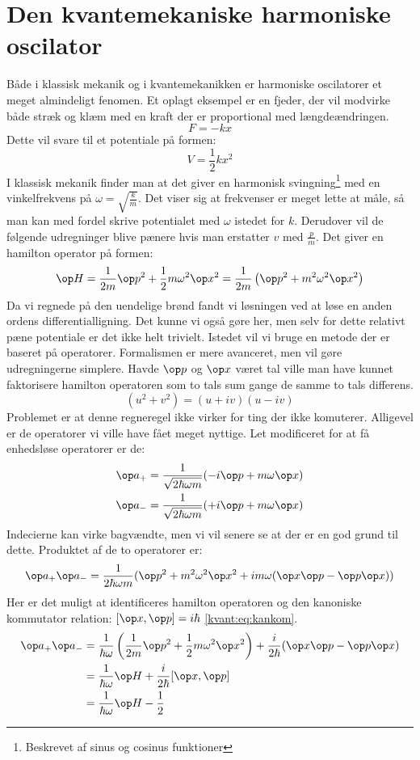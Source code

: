 \section{Den kvantemekaniske harmoniske oscilator}
Både i klassisk mekanik og i kvantemekanikken er harmoniske oscilatorer et meget almindeligt fenomen.
Et oplagt eksempel er en fjeder, der vil modvirke både stræk og klæm med en kraft der er proportional med længdeændringen.
$$
F = -kx
$$
Dette vil svare til et potentiale på formen:
$$
V=\frac{1}{2}kx^2
$$
I klassisk mekanik finder man at det giver en harmonisk svingning\footnote{Beskrevet af sinus og cosinus funktioner} med en vinkelfrekvens på $\omega = \sqrt{\frac{k}{m}}$. Det viser sig at frekvenser er meget lette at måle, så man kan med fordel skrive potentialet med $\omega$ istedet for $k$. Derudover vil de følgende udregninger blive pænere hvis man erstatter $v$ med $\frac{p}{m}$. Det giver en hamilton operator på formen:
\begin{equation}
\op H = \frac{1}{2m}\op p^2+\frac{1}{2} m\omega^2\op x^2
=
\frac{1}{2m}\left(\op p^2 + m^2\omega^2\op x^2\right)
\end{equation}
Da vi regnede på den uendelige brønd fandt vi løsningen ved at løse en anden ordens differentialligning. Det kunne vi også gøre her, men selv for dette relativt pæne potentiale er det ikke helt trivielt. Istedet vil vi bruge en metode der er baseret på operatorer. Formalismen er mere avanceret, men vil gøre udregningerne simplere.
Havde $\op p$ og $\op x$ været tal ville man have kunnet faktorisere hamilton operatoren som to tals sum gange de samme to tals differens.
$$
(u^2+v^2) = (u+iv)(u-iv)
$$
Problemet er at denne regneregel ikke virker for ting der ikke komuterer.
Alligevel er de operatorer vi ville have fået meget nyttige. Let modificeret for at få enhedsløse operatorer er de:
\begin{align}
\op a_+ &= \frac{1}{\sqrt{2\hbar \omega m}}(-i\op p+m\omega \op x)\\
\op a_- &= \frac{1}{\sqrt{2\hbar \omega m}}(+i\op p+m\omega \op x)\label{kvant:eq:alower}
\end{align}
Indecierne kan virke bagvændte, men vi vil senere se at der er en god grund til dette.
Produktet af de to operatorer er:
$$
\op a_+ \op a_- = \frac{1}{2\hbar \omega m}(\op p^2+m^2\omega^2\op x^2+im\omega (\op x\op p -  \op p \op x))
$$
Her er det muligt at identificeres hamilton operatoren og den kanoniske kommutator relation: $[\op x , \op p] = i\hbar$ \eqref{kvant:eq:kankom}.
\begin{align*}
\op a_+\op a_- &= \frac{1}{\hbar \omega}\left( \frac{1}{2m}\op p^2+\frac{1}{2}m\omega^2 \op x^2\right)+\frac{i}{2\hbar}(\op x\op p-\op p\op x)\\
&= \frac{1}{\hbar \omega}\op H+\frac{i}{2 \hbar}[\op x,\op p]\\
&= \frac{1}{\hbar \omega}\op H-\frac{1}{2}
\end{align*}
